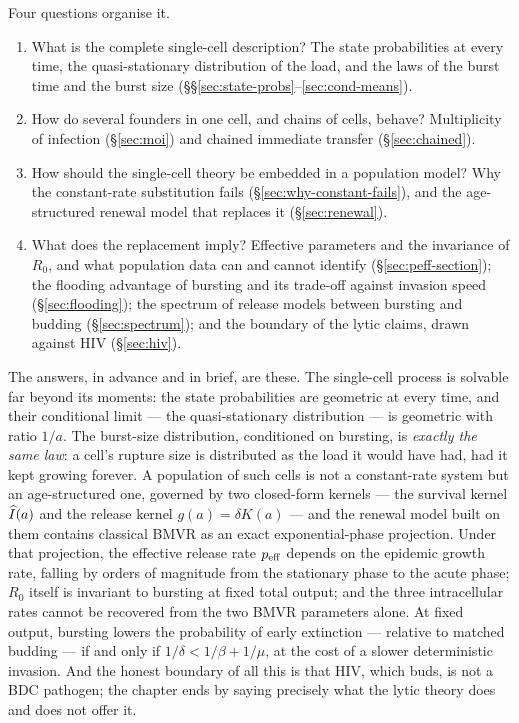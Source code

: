 Four questions organise it.
\begin{enumerate}
\item What is the complete single-cell description? The state
probabilities at every time, the quasi-stationary distribution of the
load, and the laws of the burst time and the burst size
(\S\S\ref{sec:state-probs}--\ref{sec:cond-means}).
\item How do several founders in one cell, and chains of cells, behave?
Multiplicity of infection (\S\ref{sec:moi}) and chained immediate transfer
(\S\ref{sec:chained}).
\item How should the single-cell theory be embedded in a population model?
Why the constant-rate substitution fails (\S\ref{sec:why-constant-fails}),
and the age-structured renewal model that replaces it
(\S\ref{sec:renewal}).
\item What does the replacement imply? Effective parameters and the
invariance of $R_0$, and what population data can and cannot identify
(\S\ref{sec:peff-section}); the flooding advantage of bursting and its
trade-off against invasion speed (\S\ref{sec:flooding}); the spectrum of
release models between bursting and budding (\S\ref{sec:spectrum}); and the
boundary of the lytic claims, drawn against HIV (\S\ref{sec:hiv}).
\end{enumerate}

The answers, in advance and in brief, are these. The single-cell process
is solvable far beyond its moments: the state probabilities are geometric
at every time, and their conditional limit --- the quasi-stationary
distribution --- is geometric with ratio $1/a$. The burst-size distribution,
conditioned on bursting, is \emph{exactly the same law}: a cell's rupture
size is distributed as the load it would have had, had it kept growing
forever. A population of such cells is not a constant-rate system but an
age-structured one, governed by two closed-form kernels --- the survival
kernel $\widehat{I}(a)$ and the release kernel $g(a)=\delta K(a)$ --- and the
renewal model built on them contains classical BMVR as an exact
exponential-phase projection. Under that projection, the effective release
rate $p_{\rm eff}$ depends on the epidemic growth rate, falling by orders
of magnitude from the stationary phase to the acute phase; $R_0$ itself is
invariant to bursting at fixed total output; and the three intracellular
rates cannot be recovered from the two BMVR parameters alone. At fixed
output, bursting lowers the probability of early extinction --- relative to
matched budding --- if and only if $1/\delta<1/\beta+1/\mu$, at the cost of
a slower deterministic invasion. And the honest boundary of all this is
that HIV, which buds, is not a BDC pathogen; the chapter ends by saying
precisely what the lytic theory does and does not offer it.

